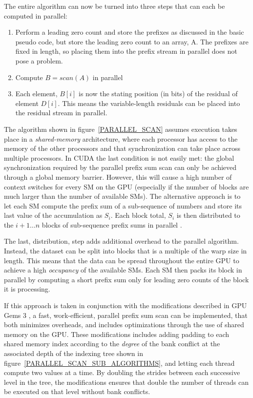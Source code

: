  The entire algorithm can now be turned into three steps that can each be computed in parallel:
 \begin{enumerate}
  \item Perform a leading zero count and store the prefixes as discussed in the basic pseudo code, but store the leading zero count to an array, A. The prefixes are fixed in length, so placing them
  into the prefix stream in parallel does not pose a problem.
  \item Compute $B = scan(A)$ in parallel
  \item Each element, $B[i]$ is now the stating position (in bits) of the residual of element $D[i]$. This means the variable-length residuals can be placed into the residual stream in parallel.
 \end{enumerate}
 
 The algorithm shown in figure~\ref{PARALLEL_SCAN} assumes execution takes place in a \textit{shared-memory} architecture, where each processor has access to the memory of the other processors and that synchronization
 can take place across multiple processors. In CUDA the last condition is not easily met: the global synchronization required by the parallel prefix sum scan can only be achieved through a global memory barrier. 
 However, this will cause a high number of context switches for every SM on the GPU (especially if the number of blocks are much larger than the number of available SMs). The alternative approach is to let each SM
 compute the prefix sum of a sub-sequence of numbers and store its last value of the accumulation as $S_{i}$. Each block total, $S_{i}$ is then distributed to the $i+1\dots n$ blocks of sub-sequence prefix sums in 
 parallel \cite{harris2007parallel}.
 
 The last, distribution, step adds additional overhead to the parallel algorithm. Instead, the dataset can be split into blocks that is a multiple of the warp size in length. This means that the data can be
 spread throughout the entire GPU to achieve a high \textit{occupancy} of the available SMs. Each SM then packs its block in parallel by computing a short prefix sum only for leading zero counts of the block 
 it is processing. 
 
 If this approach is taken in conjunction with the modifications described in GPU Gems 3 \cite{harris2007parallel}, a fast, work-efficient, parallel prefix sum scan can be implemented, that both minimizes overheads, and 
 includes optimizations through the use of shared memory on the GPU. These modifications includes adding padding  to each shared memory index according to the \textit{degree} of the bank conflict at the associated 
 depth of the indexing tree shown in figure~\ref{PARALLEL_SCAN_SUB_ALGORITHMS}, and letting each thread compute two values at a time. By doubling the strides between each successive level in the tree, the modifications 
 ensures that double the number of threads can be executed on that level without bank conflicts. 
 
